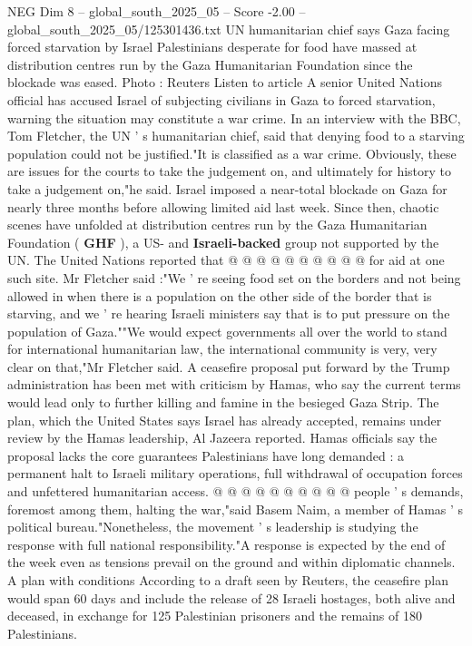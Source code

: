 \begin{textsample}{NEG Dim 8 – global\_south\_2025\_05 – Score -2.00 – global\_south\_2025\_05/125301436.txt}  \label{ex:f8_neg_002}
UN humanitarian chief says Gaza facing forced starvation by Israel Palestinians desperate for food have massed at distribution centres run by the Gaza Humanitarian Foundation since the blockade was eased.
Photo : Reuters Listen to article A senior United Nations official has accused Israel of subjecting civilians in Gaza to forced starvation, warning the situation may constitute a war crime.
In an interview with the BBC, Tom Fletcher, the UN ' s humanitarian chief, said that denying food to a starving population could not be justified."It is classified as a war crime.
Obviously, these are issues for the courts to take the judgement on, and ultimately for history to take a judgement on,"he said.
Israel imposed a near-total blockade on Gaza for nearly three months before allowing limited aid last week.
Since then, chaotic scenes have unfolded at distribution centres run by the Gaza Humanitarian Foundation ( \textbf{GHF} ), a US- and \textbf{Israeli-backed} group not supported by the UN.
The United Nations reported that @ @ @ @ @ @ @ @ @ @ for aid at one such site.
Mr Fletcher said :"We ' re seeing food set on the borders and not being allowed in when there is a population on the other side of the border that is starving, and we ' re hearing Israeli ministers say that is to put pressure on the population of Gaza.""We would expect governments all over the world to stand for international humanitarian law, the international community is very, very clear on that,"Mr Fletcher said.
A ceasefire proposal put forward by the Trump administration has been met with criticism by Hamas, who say the current terms would lead only to further killing and famine in the besieged Gaza Strip.
The plan, which the United States says Israel has already accepted, remains under review by the Hamas leadership, Al Jazeera reported.
Hamas officials say the proposal lacks the core guarantees Palestinians have long demanded : a permanent halt to Israeli military operations, full withdrawal of occupation forces and unfettered humanitarian access. @ @ @ @ @ @ @ @ @ @ people ' s demands, foremost among them, halting the war,"said Basem Naim, a member of Hamas ' s political bureau."Nonetheless, the movement ' s leadership is studying the response with full national responsibility."A response is expected by the end of the week even as tensions prevail on the ground and within diplomatic channels.
A plan with conditions According to a draft seen by Reuters, the ceasefire plan would span 60 days and include the release of 28 Israeli hostages, both alive and deceased, in exchange for 125 Palestinian prisoners and the remains of 180 Palestinians.

\end{textsample}
